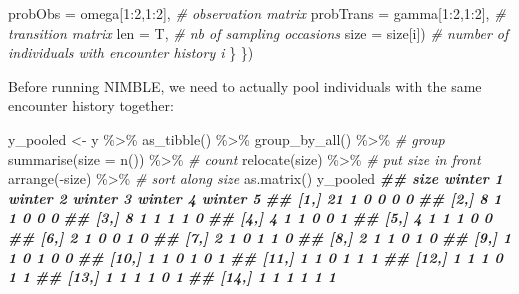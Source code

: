 \documentclass[
  12pt,
]{krantz}
\newenvironment{Shaded}{\begin{snugshade}}{\end{snugshade}}
\newcommand{\AttributeTok}[1]{\textcolor[rgb]{0.77,0.63,0.00}{#1}}
\newcommand{\CommentTok}[1]{\textcolor[rgb]{0.56,0.35,0.01}{\textit{#1}}}
\newcommand{\DecValTok}[1]{\textcolor[rgb]{0.00,0.00,0.81}{#1}}
\newcommand{\DocumentationTok}[1]{\textcolor[rgb]{0.56,0.35,0.01}{\textbf{\textit{#1}}}}
\newcommand{\FunctionTok}[1]{\textcolor[rgb]{0.00,0.00,0.00}{#1}}
\newcommand{\NormalTok}[1]{#1}
\newcommand{\OtherTok}[1]{\textcolor[rgb]{0.56,0.35,0.01}{#1}}
\newcommand{\SpecialCharTok}[1]{\textcolor[rgb]{0.00,0.00,0.00}{#1}}
\begin{document}
\begin{Shaded}
\begin{Highlighting}[]
                          \AttributeTok{probObs =}\NormalTok{ omega[}\DecValTok{1}\SpecialCharTok{:}\DecValTok{2}\NormalTok{,}\DecValTok{1}\SpecialCharTok{:}\DecValTok{2}\NormalTok{], }\CommentTok{\# observation matrix}
                          \AttributeTok{probTrans =}\NormalTok{ gamma[}\DecValTok{1}\SpecialCharTok{:}\DecValTok{2}\NormalTok{,}\DecValTok{1}\SpecialCharTok{:}\DecValTok{2}\NormalTok{], }\CommentTok{\# transition matrix}
                          \AttributeTok{len =}\NormalTok{ T, }\CommentTok{\# nb of sampling occasions}
                          \AttributeTok{size =}\NormalTok{ size[i]) }\CommentTok{\# number of individuals with encounter history i}
\NormalTok{  \}}
\NormalTok{\})}
\end{Highlighting}
\end{Shaded}

Before running NIMBLE, we need to actually pool individuals with the same encounter history together:

\begin{Shaded}
\begin{Highlighting}[]
\NormalTok{y\_pooled }\OtherTok{\textless{}{-}}\NormalTok{ y }\SpecialCharTok{\%\textgreater{}\%} 
  \FunctionTok{as\_tibble}\NormalTok{() }\SpecialCharTok{\%\textgreater{}\%} 
  \FunctionTok{group\_by\_all}\NormalTok{() }\SpecialCharTok{\%\textgreater{}\%} \CommentTok{\# group}
  \FunctionTok{summarise}\NormalTok{(}\AttributeTok{size =} \FunctionTok{n}\NormalTok{()) }\SpecialCharTok{\%\textgreater{}\%} \CommentTok{\# count}
  \FunctionTok{relocate}\NormalTok{(size) }\SpecialCharTok{\%\textgreater{}\%} \CommentTok{\# put size in front}
  \FunctionTok{arrange}\NormalTok{(}\SpecialCharTok{{-}}\NormalTok{size) }\SpecialCharTok{\%\textgreater{}\%} \CommentTok{\# sort along size}
  \FunctionTok{as.matrix}\NormalTok{()}
\NormalTok{y\_pooled}
\DocumentationTok{\#\#       size winter 1 winter 2 winter 3 winter 4 winter 5}
\DocumentationTok{\#\#  [1,]   21        1        0        0        0        0}
\DocumentationTok{\#\#  [2,]    8        1        1        0        0        0}
\DocumentationTok{\#\#  [3,]    8        1        1        1        1        0}
\DocumentationTok{\#\#  [4,]    4        1        1        0        0        1}
\DocumentationTok{\#\#  [5,]    4        1        1        1        0        0}
\DocumentationTok{\#\#  [6,]    2        1        0        0        1        0}
\DocumentationTok{\#\#  [7,]    2        1        0        1        1        0}
\DocumentationTok{\#\#  [8,]    2        1        1        0        1        0}
\DocumentationTok{\#\#  [9,]    1        1        0        1        0        0}
\DocumentationTok{\#\# [10,]    1        1        0        1        0        1}
\DocumentationTok{\#\# [11,]    1        1        0        1        1        1}
\DocumentationTok{\#\# [12,]    1        1        1        0        1        1}
\DocumentationTok{\#\# [13,]    1        1        1        1        0        1}
\DocumentationTok{\#\# [14,]    1        1        1        1        1        1}
\end{Highlighting}
\end{Shaded}
\end{document}
